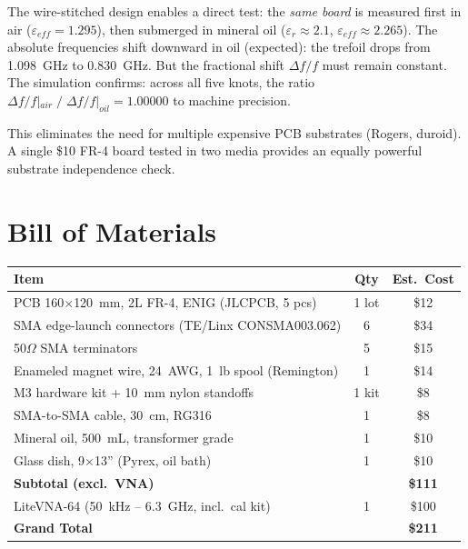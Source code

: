 The wire-stitched design enables a direct test: the \textit{same board} is measured first in air ($\varepsilon_{eff} = 1.295$), then submerged in mineral oil ($\varepsilon_{r} \approx 2.1$, $\varepsilon_{eff} \approx 2.265$). The absolute frequencies shift downward in oil (expected): the trefoil drops from 1.098~GHz to 0.830~GHz. But the fractional shift $\Delta f / f$ must remain constant. The simulation confirms: across all five knots, the ratio $\Delta f/f|_{air} \;/\; \Delta f/f|_{oil} = 1.00000$ to machine precision.

This eliminates the need for multiple expensive PCB substrates (Rogers, duroid). A single \$10 FR-4 board tested in two media provides an equally powerful substrate independence check.

\section{Bill of Materials}

\begin{center}
\begin{tabular}{|l|c|c|}
\hline
Item & Qty & Est.\ Cost \\ \hline
PCB 160$\times$120~mm, 2L FR-4, ENIG (JLCPCB, 5 pcs)           & 1 lot & \$12  \\
SMA edge-launch connectors (TE/Linx CONSMA003.062)              & 6     & \$34  \\
50$\Omega$ SMA terminators                                      & 5     & \$15  \\
Enameled magnet wire, 24~AWG, 1~lb spool (Remington)            & 1     & \$14  \\
M3 hardware kit + 10~mm nylon standoffs                         & 1 kit & \$8   \\
SMA-to-SMA cable, 30~cm, RG316                                  & 1     & \$8   \\
Mineral oil, 500~mL, transformer grade                          & 1     & \$10  \\
Glass dish, 9$\times$13'' (Pyrex, oil bath)                     & 1     & \$10  \\ \hline
\textbf{Subtotal (excl.\ VNA)}                                   &       & \textbf{\$111} \\ \hline
LiteVNA-64 (50~kHz -- 6.3~GHz, incl.\ cal kit)                  & 1     & \$100 \\ \hline
\textbf{Grand Total}                                             &       & \textbf{\$211} \\ \hline
\end{tabular}
\end{center}

